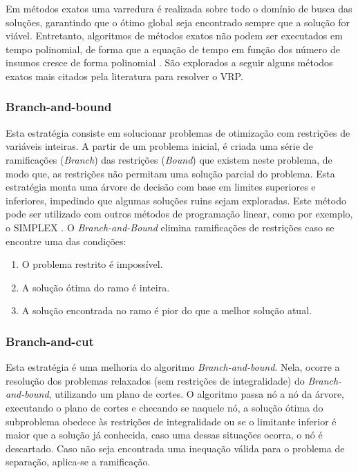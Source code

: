 Em métodos exatos uma varredura é realizada sobre todo o domínio de busca das soluções, garantindo que o ótimo global seja encontrado sempre que a solução for viável. Entretanto, algoritmos de métodos exatos não podem ser executados em tempo polinomial, de forma que a equação de tempo em função dos número de insumos cresce de forma polinomial \cite{maxwell}. São explorados a seguir alguns métodos exatos mais citados pela literatura para resolver o VRP.

\subsubsection{Branch-and-bound}
Esta estratégia consiste em solucionar problemas de otimização com restrições de variáveis inteiras. A partir de um problema inicial, é criada uma série de ramificações (\emph{Branch}) das restrições (\emph{Bound}) que existem neste problema, de modo que, as restrições não permitam uma solução parcial do problema. Esta estratégia monta uma árvore de decisão com base em limites superiores e inferiores, impedindo que algumas soluções ruins sejam exploradas. Este método pode ser utilizado com outros métodos de programação linear, como por exemplo, o SIMPLEX \cite{LAPORTE1992345}. O \emph{Branch-and-Bound} elimina ramificações de restrições caso se encontre uma das condições:

\begin{enumerate}
    \item O problema restrito é impossível.
    \item A solução ótima do ramo é inteira.
    \item A solução encontrada no ramo é pior do que a melhor solução atual.
\end{enumerate}

\subsubsection{Branch-and-cut}
Esta estratégia é uma melhoria do algoritmo \emph{Branch-and-bound}. Nela, ocorre a resolução dos problemas relaxados (sem restrições de integralidade) do \emph{Branch-and-bound}, utilizando um plano de cortes. O algoritmo passa nó a nó da árvore, executando o plano de cortes e checando se naquele nó, a solução ótima do subproblema obedece às restrições de integralidade ou se o limitante inferior é maior que a solução já conhecida, caso uma dessas situações ocorra, o nó é descartado. Caso não seja encontrada uma inequação válida para o problema de separação, aplica-se a ramificação.


